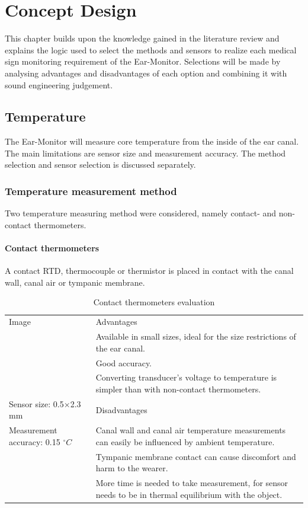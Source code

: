 \chapter{Concept Design}
\label{chp:ConDes}
This chapter builds upon the knowledge gained in the literature review and explains the logic used to select the methods and sensors to realize each medical sign monitoring requirement of the Ear-Monitor. Selections will be made by analysing advantages and disadvantages of each option and combining it with sound engineering judgement.

\section{Temperature}
The Ear-Monitor will measure core temperature from the inside of the ear canal. The main limitations are sensor size and measurement accuracy. The method selection and sensor selection is discussed separately.

\subsection{Temperature measurement method}
Two temperature measuring method were considered, namely contact- and non-contact thermometers.

\subsubsection{Contact thermometers}
A contact RTD, thermocouple or thermistor is placed in contact with the canal wall, canal air or tympanic membrane.

\begin{table}[H]
\caption{Contact thermometers evaluation}
\label{tab:ContactThermometers_Eval}
\renewcommand{\arraystretch}{1.3}	%
\centering
\begin{tabular}{|p{5cm}|p{8cm}|} 
 \hline
 Image 						& 	Advantages\\ 
							&	\tabitem Available in small sizes, ideal for the size restrictions of the ear canal.\\
  							&	\tabitem Good accuracy.\\
  							&	\tabitem Converting transducer's voltage to temperature is simpler than with non-contact thermometers.\\
\hline
Sensor size: 0.5$\times$2.3 mm 				& 	Disadvantages\\ 
Measurement accuracy: 0.15 $^{\circ}C$ 		&	\tabitem Canal wall and canal air temperature measurements can easily be influenced by ambient temperature.\\
  											&	\tabitem Tympanic membrane contact can cause discomfort and harm to the wearer.\\
  											&	\tabitem More time is needed to take measurement, for sensor needs to be in thermal equilibrium with the object.\\
 \hline
\end{tabular}
\end{table}

